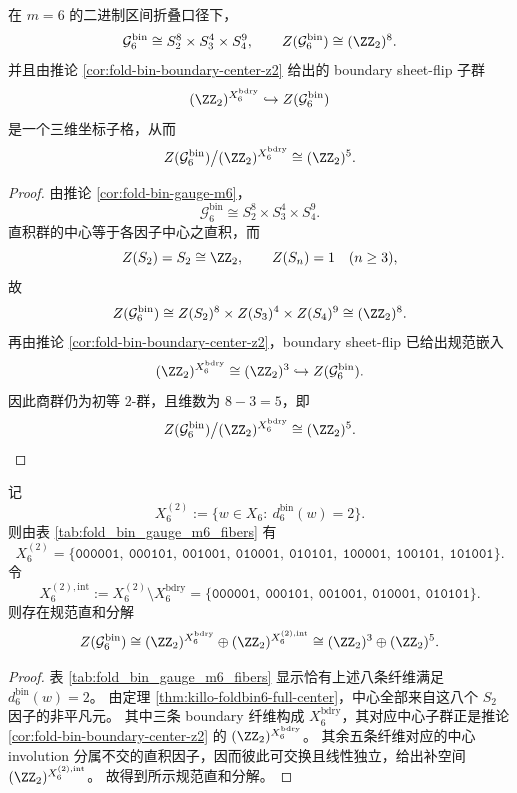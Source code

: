 \begin{theorem}\label{thm:killo-foldbin6-full-center}
在 \(m=6\) 的二进制区间折叠口径下，
\[
\mathcal{G}^{\mathrm{bin}}_6\cong S_2^{8}\times S_3^{4}\times S_4^{9},
\qquad
Z(\mathcal{G}^{\mathrm{bin}}_6)\cong (\ZZ_2)^8.
\]
并且由推论 \ref{cor:fold-bin-boundary-center-z2} 给出的 boundary sheet-flip 子群
\[
(\ZZ_2)^{X^{\mathrm{bdry}}_6}\hookrightarrow Z(\mathcal{G}^{\mathrm{bin}}_6)
\]
是一个三维坐标子格，从而
\[
Z(\mathcal{G}^{\mathrm{bin}}_6)\big/(\ZZ_2)^{X^{\mathrm{bdry}}_6}\cong (\ZZ_2)^5.
\]
\end{theorem}
\begin{proof}
由推论 \ref{cor:fold-bin-gauge-m6}，
\[
\mathcal{G}^{\mathrm{bin}}_6\cong S_2^{8}\times S_3^{4}\times S_4^{9}.
\]
直积群的中心等于各因子中心之直积，而
\[
Z(S_2)=S_2\cong \ZZ_2,
\qquad
Z(S_n)=1\quad(n\ge 3),
\]
故
\[
Z(\mathcal{G}^{\mathrm{bin}}_6)\cong Z(S_2)^8\times Z(S_3)^4\times Z(S_4)^9\cong (\ZZ_2)^8.
\]
再由推论 \ref{cor:fold-bin-boundary-center-z2}，boundary sheet-flip 已给出规范嵌入
\[
(\ZZ_2)^{X^{\mathrm{bdry}}_6}\cong (\ZZ_2)^3\hookrightarrow Z(\mathcal{G}^{\mathrm{bin}}_6).
\]
因此商群仍为初等 \(2\)-群，且维数为 \(8-3=5\)，即
\[
Z(\mathcal{G}^{\mathrm{bin}}_6)\big/(\ZZ_2)^{X^{\mathrm{bdry}}_6}\cong (\ZZ_2)^5.
\]
\end{proof}

\begin{corollary}\label{cor:killo-foldbin6-center-boundary-interior}
记
\[
X^{(2)}_6:=\{w\in X_6:\ d^{\mathrm{bin}}_6(w)=2\}.
\]
则由表 \ref{tab:fold_bin_gauge_m6_fibers} 有
\[
X^{(2)}_6=
\{\texttt{000001},\ \texttt{000101},\ \texttt{001001},\ \texttt{010001},\ \texttt{010101},\ \texttt{100001},\ \texttt{100101},\ \texttt{101001}\}.
\]
令
\[
X^{(2),\mathrm{int}}_6:=X^{(2)}_6\setminus X^{\mathrm{bdry}}_6
=
\{\texttt{000001},\ \texttt{000101},\ \texttt{001001},\ \texttt{010001},\ \texttt{010101}\}.
\]
则存在规范直和分解
\[
Z(\mathcal{G}^{\mathrm{bin}}_6)
\cong
(\ZZ_2)^{X^{\mathrm{bdry}}_6}\oplus (\ZZ_2)^{X^{(2),\mathrm{int}}_6}
\cong (\ZZ_2)^3\oplus(\ZZ_2)^5.
\]
\end{corollary}
\begin{proof}
表 \ref{tab:fold_bin_gauge_m6_fibers} 显示恰有上述八条纤维满足 \(d^{\mathrm{bin}}_6(w)=2\)。
由定理 \ref{thm:killo-foldbin6-full-center}，中心全部来自这八个 \(S_2\) 因子的非平凡元。
其中三条 boundary 纤维构成 \(X^{\mathrm{bdry}}_6\)，其对应中心子群正是推论 \ref{cor:fold-bin-boundary-center-z2} 的 \((\ZZ_2)^{X^{\mathrm{bdry}}_6}\)。
其余五条纤维对应的中心 involution 分属不交的直积因子，因而彼此可交换且线性独立，给出补空间 \((\ZZ_2)^{X^{(2),\mathrm{int}}_6}\)。
故得到所示规范直和分解。
\end{proof}

\endinput
